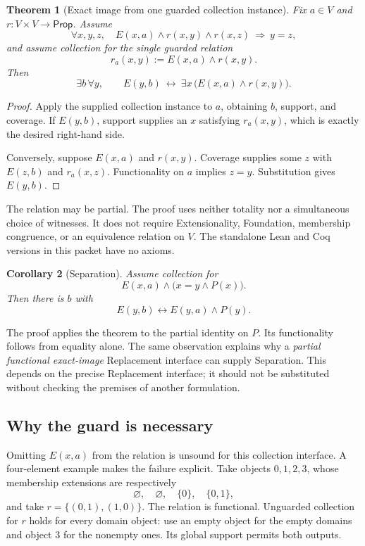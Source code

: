 \documentclass[11pt,letterpaper]{article}
\newtheorem{theorem}{Theorem}
\newtheorem{corollary}[theorem]{Corollary}
\begin{document}
\begin{theorem}[Exact image from one guarded collection instance]
Fix \(a\in V\) and \(r:V\times V\to\mathsf{Prop}\). Assume
\[
 \forall x,y,z,\quad E(x,a)\land r(x,y)\land r(x,z)\ \Rightarrow\ y=z,
\]
and assume collection for the single guarded relation
\[
 r_a(x,y):=E(x,a)\land r(x,y).
\]
Then
\[
 \exists b\,\forall y,\qquad
 E(y,b)\ \longleftrightarrow\
 \exists x\,\bigl(E(x,a)\land r(x,y)\bigr).
\]
\end{theorem}

\begin{proof}
Apply the supplied collection instance to \(a\), obtaining \(b\), support,
and coverage. If \(E(y,b)\), support supplies an \(x\) satisfying
\(r_a(x,y)\), which is exactly the desired right-hand side.

Conversely, suppose \(E(x,a)\) and \(r(x,y)\).
Coverage supplies some \(z\) with \(E(z,b)\) and \(r_a(x,z)\).
Functionality on \(a\) implies \(z=y\). Substitution gives \(E(y,b)\).
\end{proof}

The relation may be partial. The proof uses neither totality nor a simultaneous
choice of witnesses. It does not require Extensionality, Foundation,
membership congruence, or an equivalence relation on \(V\).
The standalone Lean and Coq versions in this packet have no axioms.

\begin{corollary}[Separation]
Assume collection for
\[
 E(x,a)\land\bigl(x=y\land P(x)\bigr).
\]
Then there is \(b\) with
\[
 E(y,b)\longleftrightarrow E(y,a)\land P(y).
\]
\end{corollary}

The proof applies the theorem to the partial identity on \(P\).
Its functionality follows from equality alone.
The same observation explains why a \emph{partial functional exact-image}
Replacement interface can supply Separation. This depends on the precise
Replacement interface; it should not be substituted without checking the
premises of another formulation.

\subsection{Why the guard is necessary}

Omitting \(E(x,a)\) from the relation is unsound for this collection interface.
A four-element example makes the failure explicit. Take objects
\(0,1,2,3\), whose membership extensions are respectively
\[
 \varnothing,\quad \varnothing,\quad \{0\},\quad \{0,1\},
\]
and take \(r=\{(0,1),(1,0)\}\). The relation is functional.
Unguarded collection for \(r\) holds for every domain object:
use an empty object for the empty domains and object \(3\) for the
nonempty ones. Its global support permits both outputs.
\end{document}
